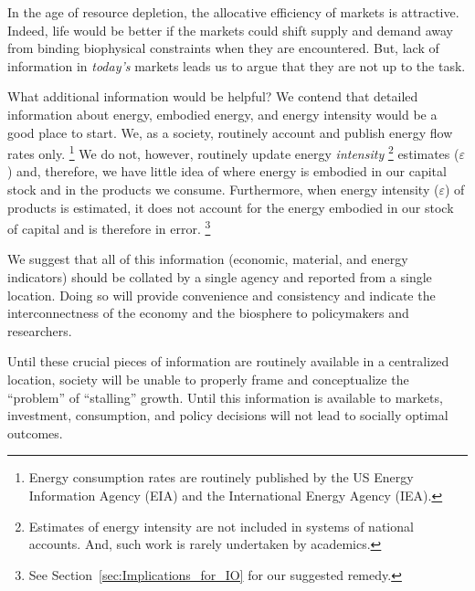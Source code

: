 In the age of resource depletion, 
the allocative efficiency of markets is attractive.
Indeed, life would be better if the markets could shift supply and demand 
away from binding biophysical constraints
when they are encountered.
But, lack of information in \emph{today's} markets
leads us to argue that they
are not up to the task.

What additional information would be helpful?
We contend that detailed information about energy, embodied energy, and energy intensity
would be a good place to start.
We, as a society, routinely account and publish energy flow rates only.%
	 \footnote{
	 Energy consumption rates are routinely published by the 
	 US Energy Information Agency (EIA) and the 
	 International Energy Agency (IEA).
	 }
We do not, however, routinely update energy \emph{intensity}%
	\footnote{
	Estimates of energy intensity are not included in systems of national accounts.
	And, such work is rarely undertaken by academics.\citep{Bullard1975, EIOLCA2014} 
	}
estimates ($\varepsilon$)
and, therefore, 
we have little idea of where energy is embodied 
in our capital stock and 
in the products we consume.
Furthermore, when energy intensity ($\varepsilon$) of products is estimated, 
it does not account for the energy embodied in our stock of capital
and is therefore in error.%
	\footnote{
	See Section~\ref{sec:Implications_for_IO} for our suggested remedy.
	}
	
We suggest that all of this information 
(economic, material, and energy indicators) 
should be collated by a single agency and
reported from a single location.
Doing so will provide convenience and consistency and
indicate the interconnectness of the economy and the biosphere
to policymakers and researchers.

Until these crucial pieces of information are routinely available 
in a centralized location, 
society will be unable to properly frame and conceptualize 
the ``problem'' of ``stalling'' growth. 
Until this information is available to markets,
investment, consumption, and policy decisions will
not lead to socially optimal outcomes.



